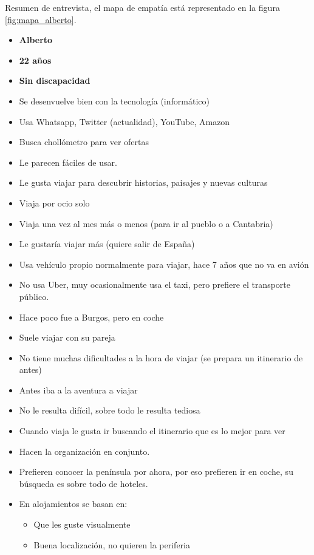 Resumen de entrevista, el mapa de empatía está representado en la figura \ref{fig:mapa_alberto}.

\begin{itemize}
    \item \textbf{Alberto}
    \item \textbf{22 años}
    \item \textbf{Sin discapacidad}
    \item Se desenvuelve bien con la tecnología (informático)
    \item Usa Whatsapp, Twitter (actualidad), YouTube, Amazon
    \item Busca chollómetro para ver ofertas
    \item Le parecen fáciles de usar.
    \item Le gusta viajar para descubrir historias, paisajes y nuevas culturas
    \item Viaja por ocio solo
    \item Viaja una vez al mes más o menos (para ir al pueblo o a Cantabria)
    \item Le gustaría viajar más (quiere salir de España)
    \item Usa vehículo propio normalmente para viajar, hace 7 años que no va en avión
    \item No usa Uber, muy ocasionalmente usa el taxi, pero prefiere el transporte público.
    \item Hace poco fue a Burgos, pero en coche
    \item Suele viajar con su pareja
    \item No tiene muchas dificultades a la hora de viajar (se prepara un itinerario de antes)
    \item Antes iba a la aventura a viajar
    \item No le resulta difícil, sobre todo le resulta tediosa
    \item Cuando viaja le gusta ir buscando el itinerario que es lo mejor para ver
    \item Hacen la organización en conjunto.
    \item Prefieren conocer la península por ahora, por eso prefieren ir en coche, su búsqueda es sobre todo de hoteles.
    \item En alojamientos se basan en:
    \begin{itemize}
        \item Que les guste visualmente
        \item Buena localización, no quieren la periferia

\end{itemize}
\end{itemize}
